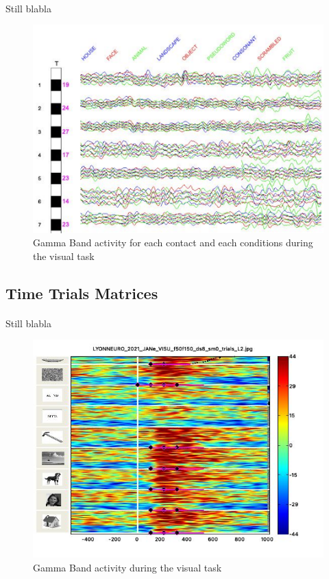 \documentclass[a4paper]{article}
\begin{document}
\paragraph{} Still blabla
\begin{figure}[H]
\begin{center}
\includegraphics[scale=0.8]{EnvelopePlots.png}
\end{center}
\caption{\label{EnvelopePlotsPicture}Gamma Band activity for each contact and each conditions during the visual task}
\end{figure}
\subsection{Time Trials Matrices}
\paragraph{} Still blabla
\begin{figure}[H]
\begin{center}
\includegraphics[scale=0.7]{TimeTrialsMatrice.jpg}
\end{center}
\caption{\label{TimeTrialsPicture}Gamma Band activity during the visual task}
\end{figure}
\end{document}
